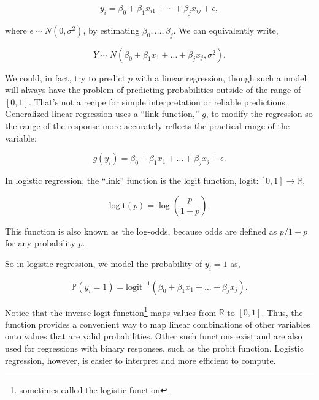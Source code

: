 \documentclass[12pt,twoside]{reedthesis}
\begin{document}
  \[y_i = \beta_0 + \beta_1 x_{i1} + \cdots + \beta_j x_{ij} + \epsilon,\]
  
  where \(\epsilon \sim N(0, \sigma^2)\), by estimating
  \(\beta_0, \ldots, \beta_j\). We can equivalently write,
  
  \[Y \sim N(\beta_0 + \beta_1 x_1 + \ldots + \beta_j x_j, \sigma^2).\]
  
  We could, in fact, try to predict \(p\) with a linear regression, though
  such a model will always have the problem of predicting probabilities
  outside of the range of \([0, 1]\). That's not a recipe for simple
  interpretation or reliable predictions. Generalized linear regression
  uses a ``link function,'' \(g\), to modify the regression so the range
  of the response more accurately reflects the practical range of the
  variable:
  
  \[g(y_i) = \beta_0 + \beta_1 x_1 + \ldots + \beta_j x_j + \epsilon.\]
  
  In logistic regression, the ``link'' function is the logit function,
  \(\text{logit}:[0,1] \to \mathbb{R}\),
  
  \[\text{logit} (p) = \log \left(\frac{p}{1-p}\right). \]
  
  This function is also known as the log-odds, because odds are defined as
  \(p/1-p\) for any probability \(p\).
  
  So in logistic regression, we model the probability of \(y_i = 1\) as,
  
  \[\mathbb{P} (y_i = 1) = \text{logit}^{-1} (\beta_0 + \beta_1 x_1 + \ldots + \beta_j x_j).\]
  
  Notice that the inverse logit function\footnote{sometimes called the
    logistic function} maps values from \(\mathbb{R}\) to \([0,1]\). Thus,
  the function provides a convenient way to map linear combinations of
  other variables onto values that are valid probabilities. Other such
  functions exist and are also used for regressions with binary responses,
  such as the probit function. Logistic regression, however, is easier to
  interpret and more efficient to compute.
  
\end{document}

